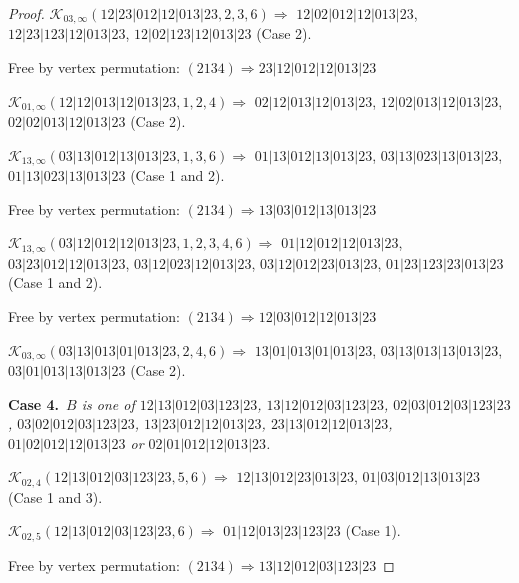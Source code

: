 \documentclass[12pt]{article}
\theoremstyle{plain}
\theoremstyle{definition}
\theoremstyle{remark}
\newcommand{\fancy}[1]{\mathcal{#1}}
\def\K{\fancy{K}}
\newcommand{\case}[2]{{\bf Case #1.}~{\it #2}~~}
\begin{document}
\begin{proof}
	
	\bigskip
	
	$\K_{03,\infty}(12|23|012|12|013|23,2, 3, 6)\Rightarrow $ $12|02|012|12|013|23$, $12|23|123|12|013|23$, $12|02|123|12|013|23$ (Case 2).
	
	
	
	Free by vertex permutation: $(2 1 3 4)\Rightarrow 23|12|012|12|013|23$
	
	
	\bigskip
	
	$\K_{01,\infty}(12|12|013|12|013|23,1, 2, 4)\Rightarrow $ $02|12|013|12|013|23$, $12|02|013|12|013|23$, $02|02|013|12|013|23$ (Case 2).
	
	\bigskip
	
	$\K_{13,\infty}(03|13|012|13|013|23,1, 3, 6)\Rightarrow $ $01|13|012|13|013|23$, $03|13|023|13|013|23$, $01|13|023|13|013|23$ (Case 1 and 2).
	
	
	
	Free by vertex permutation: $(2 1 3 4)\Rightarrow 13|03|012|13|013|23$
	
	
	\bigskip
	
	$\K_{13,\infty}(03|12|012|12|013|23,1, 2, 3, 4, 6)\Rightarrow $ $01|12|012|12|013|23$, $03|23|012|12|013|23$, $03|12|023|12|013|23$, $03|12|012|23|013|23$, $01|23|123|23|013|23$ (Case 1 and 2).
	
	
	
	Free by vertex permutation: $(2 1 3 4)\Rightarrow 12|03|012|12|013|23$
	
	
	\bigskip
	
	$\K_{03,\infty}(03|13|013|01|013|23,2, 4, 6)\Rightarrow $ $13|01|013|01|013|23$, $03|13|013|13|013|23$, $03|01|013|13|013|23$ (Case 2).
	
	\bigskip
	
	
	\bigskip
	\case{4}{$B$ is one of $12|13|012|03|123|23$, $13|12|012|03|123|23$, $02|03|012|03|123|23$, $03|02|012|03|123|23$, $13|23|012|12|013|23$, $23|13|012|12|013|23$, $01|02|012|12|013|23$ or $02|01|012|12|013|23$.}
	
	\bigskip
	
	$\K_{02,4}(12|13|012|03|123|23,5, 6)\Rightarrow $ $12|13|012|23|013|23$, $01|03|012|13|013|23$ (Case 1 and 3).
	
	$\K_{02,5}(12|13|012|03|123|23,6)\Rightarrow $ $01|12|013|23|123|23$ (Case 1).
	
	
	
	Free by vertex permutation: $(2 1 3 4)\Rightarrow 13|12|012|03|123|23$
	
	
	
	\bigskip
	

\end{proof}
\end{document}

